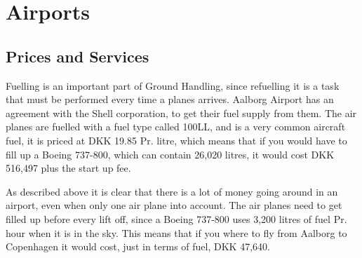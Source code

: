\chapter{Airports}
\section{Prices and Services}

Fuelling is an important part of Ground Handling, since refuelling it is a task that must be performed every time a planes arrives. Aalborg Airport has an agreement with the Shell corporation, to get their fuel supply from them. The air planes are fuelled with a fuel type called 100LL, and is a very common aircraft fuel, it is priced at DKK 19.85 Pr. litre, which means that if you would have to fill up a Boeing 737-800, which can contain 26,020 litres, it would cost DKK 516,497 plus the start up fee.

As described above it is clear that there is a lot of money going around in an airport, even when only one air plane into account. The air planes need to get filled up before every lift off, since a Boeing 737-800 uses 3,200 litres of fuel Pr. hour when it is in the sky. This means that if you where to fly from Aalborg to Copenhagen it would cost, just in terms of fuel, DKK 47,640.

%
